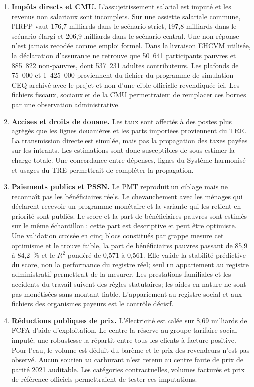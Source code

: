 \documentclass[11pt,a4paper]{article}
\begin{document}
\begin{enumerate}
\item \textbf{Impôts directs et CMU.} L'assujettissement salarial est imputé et
les revenus non salariaux sont incomplets. Sur une assiette salariale commune,
l'IRPP vaut 176,7 milliards dans le scénario strict, 197,8 milliards dans le
scénario élargi et 206,9 milliards dans le scénario central. Une non-réponse
n'est jamais recodée comme emploi formel. Dans la livraison EHCVM utilisée, la
déclaration d'assurance ne retrouve que 50~641 participants pauvres et 885~822
non-pauvres, dont 537~231 adultes contributeurs. Les plafonds de 75~000 et
1~425~000 proviennent du fichier  du programme de
simulation CEQ archivé avec le projet et non d'une cible officielle revendiquée
ici. Les fichiers fiscaux, sociaux et de la CMU permettraient de remplacer ces
bornes par une observation administrative.

\item \textbf{Accises et droits de douane.} Les taux sont affectés à des postes
plus agrégés que les lignes douanières et les parts importées proviennent du
TRE. La transmission directe est simulée, mais pas la propagation des taxes
payées sur les intrants. Les estimations sont donc susceptibles de sous-estimer
la charge totale. Une concordance entre dépenses, lignes du Système harmonisé
et usages du TRE permettrait de compléter la propagation.

\item \textbf{Paiements publics et PSSN.} Le PMT reproduit un ciblage mais ne
reconnaît pas les bénéficiaires réels. Le chevauchement avec les ménages qui
déclarent recevoir un programme monétaire et la variante qui les retient en
priorité sont publiés. Le score et la part de bénéficiaires pauvres sont estimés
sur le même échantillon : cette part est descriptive et peut être optimiste. Une
validation croisée en cinq blocs constitués par grappe mesure cet optimisme et le
trouve faible, la part de bénéficiaires pauvres passant de 85,9 à 84,2~\% et le
$R^2$ pondéré de 0,571 à 0,561. Elle valide la stabilité prédictive du score,
non la performance du registre réel; seul un appariement au registre
administratif permettrait de la mesurer.
Les prestations familiales et les
accidents du travail suivent des règles statutaires; les aides en nature ne sont
pas monétisées sans montant fiable. L'appariement au registre social et aux
fichiers des organismes payeurs est le contrôle décisif.

\item \textbf{Réductions publiques de prix.} L'électricité est calée sur
8,69 milliards de FCFA d'aide d'exploitation. Le centre la réserve au groupe
tarifaire social imputé; une robustesse la répartit entre tous les clients à
facture positive. Pour l'eau, le volume est déduit du barème
et le prix des revendeurs n'est pas observé. Aucun soutien au carburant n'est
retenu au centre faute de prix de parité 2021 auditable. Les catégories
contractuelles, volumes facturés et prix de référence officiels permettraient
de tester ces imputations.


\end{enumerate}
\end{document}
